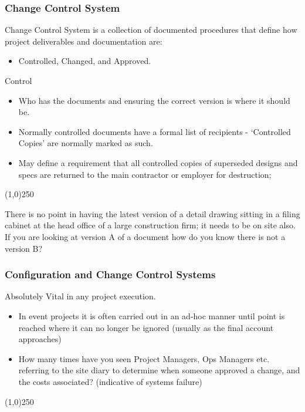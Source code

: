 \begin{frame}
\frametitle{Change Control System}
Change Control System is a collection of documented procedures that define how project deliverables and documentation are:
\begin{itemize}
	\item Controlled, Changed, and Approved.
\end{itemize}
Control 
\begin{itemize}
	\item Who has the documents and ensuring the correct version is where it should be.
	\item Normally controlled documents have a formal list of recipients - `Controlled Copies' are normally marked as such. 
	\item May define a requirement that all controlled copies of superseded designs and specs are returned to the main contractor or employer for destruction;  
\end{itemize}
\end{frame}\begin{center}\line(1,0){250}\end{center}
There is no point in having the latest version of a detail drawing sitting in a filing cabinet at the head office of a large construction firm; it needs to be on site also. If you are looking at version A of a document how do you know there is not a version B?
%

\begin{frame}
\frametitle{Configuration and Change Control Systems}
Absolutely Vital in any project execution.\\
\begin{itemize}
	\item In event projects it is often carried out in an ad-hoc manner until point is reached where it can no longer be ignored (usually as the final account approaches)\\
	\item How many times have you seen Project Managers, Ops Managers etc. referring to the site diary to determine when someone approved a change, and the costs associated? (indicative of systems failure)
\end{itemize}
\end{frame}\begin{center}\line(1,0){250}\end{center}
%
%

